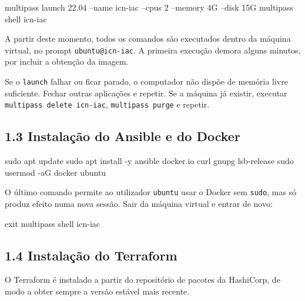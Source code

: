 \documentclass[11pt,a4paper]{article}
\newcommand{\cmd}[1]{\texttt{#1}}
\begin{document}
\begin{terminal}
multipass launch 22.04 --name icn-iac --cpus 2 --memory 4G --disk 15G
multipass shell icn-iac
\end{terminal}


A partir deste momento, todos os comandos são executados dentro da máquina virtual, no prompt \cmd{ubuntu@icn-iac}. A primeira execução demora alguns minutos, por incluir a obtenção da imagem.

\begin{erro}
Se o \cmd{launch} falhar ou ficar parado, o computador não dispõe de memória livre suficiente. Fechar outras aplicações e repetir. Se a máquina já existir, executar \cmd{multipass delete icn-iac}, \cmd{multipass purge} e repetir.
\end{erro}

\subsection*{1.3 Instalação do Ansible e do Docker}

\begin{terminal}
sudo apt update
sudo apt install -y ansible docker.io curl gnupg lsb-release
sudo usermod -aG docker ubuntu
\end{terminal}

O último comando permite ao utilizador \cmd{ubuntu} usar o Docker sem \cmd{sudo}, mas só produz efeito numa nova sessão. Sair da máquina virtual e entrar de novo:

\begin{terminal}
exit
multipass shell icn-iac
\end{terminal}

\subsection*{1.4 Instalação do Terraform}

O Terraform é instalado a partir do repositório de pacotes da HashiCorp, de modo a obter sempre a versão estável mais recente.

\end{document}

